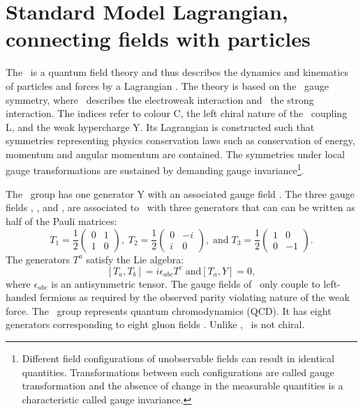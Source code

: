 \newpage
\section{Standard Model Lagrangian, connecting fields with particles}
\label{sec:SMlagr}
The \SM\ is a quantum field theory and thus describes the dynamics and kinematics of particles and forces by a Lagrangian \Lagr. The theory is based on the \SSU\ gauge symmetry, where \SU\ describes the electroweak interaction and \Sthree\ the strong interaction. The indices refer to colour C, the left chiral nature of the \Stwo\ coupling L, and the weak hypercharge Y. Its Lagrangian is constructed such that symmetries representing physics conservation laws such as conservation of energy, momentum and angular momentum are contained. The symmetries under local gauge transformations are sustained by demanding gauge invariance\footnote{Different field configurations of unobservable fields can result in identical quantities. Transformations between such configurations are called gauge transformation and the absence of change in the measurable quantities is a characteristic called gauge invariance.}.  



The \Uone\ group has one generator Y with an associated gauge field \Bfield. The three gauge fields \Wfieldone, \Wfieldtwo, and \Wfieldthree, are associated to \Stwo\ with three generators that can can  be written as half of the Pauli matrices: 
\begin{equation}
T_1 =  \frac{1}{2}
\begin{pmatrix}
0  &  1      \\
1  & 0      
\end{pmatrix}, \;
T_2= \frac{1}{2}
\begin{pmatrix}
0  &  -i     \\
i  &  0      
\end{pmatrix},\;\mathrm{ and } \;
 T_3= \frac{1}{2}
 \begin{pmatrix}
 1  &  0     \\
 0  &  -1 
 \end{pmatrix}.
 \label{eq:Stwee}
\end{equation}
The generators $T^a$ satisfy the Lie algebra: 
\begin{equation}
 \left[T_a,T_b\right] = i \epsilon_{abc} T^c \; \mathrm{ and } \left[T_a, Y\right] = 0, 
\end{equation}
where $\epsilon_{abc}$ is an antisymmetric tensor. The gauge fields of \Stwo\ only couple to left-handed fermions as required by the observed parity violating nature of the weak force. The \Sthree\ group represents quantum chromodynamics (QCD). It  has eight generators corresponding to eight gluon fields \Gfields. Unlike \SU, \Sthree\ is not chiral. 

